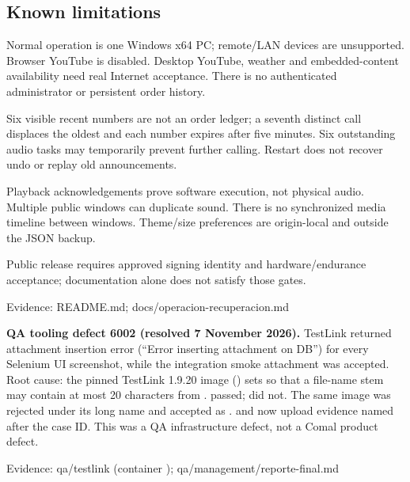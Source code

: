 \subsection{Known limitations}

Normal operation is one Windows x64 PC; remote/LAN devices are unsupported. Browser YouTube is disabled. Desktop YouTube, weather and embedded-content availability need real Internet acceptance. There is no authenticated administrator or persistent order history.

Six visible recent numbers are not an order ledger; a seventh distinct call displaces the oldest and each number expires after five minutes. Six outstanding audio tasks may temporarily prevent further calling. Restart does not recover undo or replay old announcements.

Playback acknowledgements prove software execution, not physical audio. Multiple public windows can duplicate sound. There is no synchronized media timeline between windows. Theme/size preferences are origin-local and outside the JSON backup.

Public release requires approved signing identity and hardware/endurance acceptance; documentation alone does not satisfy those gates.

Evidence: README.md; docs/operacion-recuperacion.md

\textbf{QA tooling defect 6002 (resolved 7 November 2026).} TestLink returned attachment insertion error  (``Error inserting attachment on DB'') for every Selenium UI screenshot, while the integration smoke attachment was accepted. Root cause: the pinned TestLink 1.9.20 image () sets  so that a file-name stem may contain at most 20 characters from \Code{[a-zA-Z0-9\_-]}.  passed;  did not. The same image was rejected under its long name and accepted as .  and  now upload evidence named after the case ID. This was a QA infrastructure defect, not a Comal product defect.

Evidence: qa/testlink (container ); qa/management/reporte-final.md
